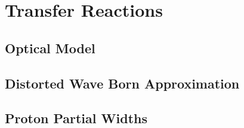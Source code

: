 
\section{Transfer Reactions}



\subsection{Optical Model} \label{subsec:Optical_Model}

\subsection{Distorted Wave Born Approximation} \label{subsec:DWBA}




\subsection{Proton Partial Widths} \label{subsec:PartialWidths}
